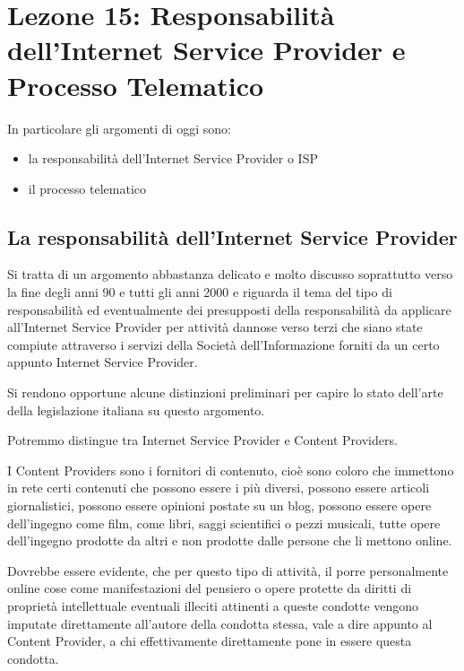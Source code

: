 \chapter{Lezone 15: Responsabilità dell'Internet Service Provider e Processo Telematico}

In particolare gli argomenti di oggi sono:

\begin{itemize}
    \item la responsabilità dell'Internet Service Provider o ISP
    \item il processo telematico
\end{itemize}

\section{La responsabilità dell'Internet Service Provider}

Si tratta di un argomento abbastanza delicato e molto discusso soprattutto verso la fine degli anni 90 e tutti gli anni 2000 e riguarda il tema del tipo di responsabilità ed eventualmente dei presupposti della responsabilità da applicare all'Internet Service Provider per attività dannose verso terzi che siano state compiute attraverso i servizi della Società dell'Informazione forniti da un certo appunto Internet Service Provider. 

Si rendono opportune alcune distinzioni preliminari per capire lo stato dell'arte della legislazione italiana su questo argomento. 

Potremmo distingue tra Internet Service Provider e Content Providers. 

I Content Providers sono i fornitori di contenuto, cioè sono coloro che immettono in rete certi contenuti che possono essere i più diversi, possono essere articoli giornalistici, possono essere opinioni postate su un blog, possono essere opere dell'ingegno come film, come libri, saggi scientifici o pezzi musicali, tutte opere dell'ingegno prodotte da altri e non prodotte dalle persone che li mettono online. 

Dovrebbe essere evidente, che per questo tipo di attività, il porre personalmente online cose come manifestazioni del pensiero o opere protette da diritti di proprietà intellettuale eventuali illeciti attinenti a queste condotte vengono imputate direttamente all'autore della condotta stessa, vale a dire appunto al Content Provider, a chi effettivamente direttamente pone in essere questa condotta. 


